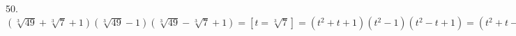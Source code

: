 50. $(\sqrt[3]{49}+\sqrt[3]{7}+1)(\sqrt[3]{49}-1)(\sqrt[3]{49}-\sqrt[3]{7}+1)=[t=\sqrt[3]{7}]=(t^2+t+1)(t^2-1)(t^2-t+1)=
(t^2+t-1)(t-1)(t+1)(t^2-t+1)=(t^3+1)(t^3-1)=t^6-1=(\sqrt[3]{7})^6-1=49-1=48.$\\
